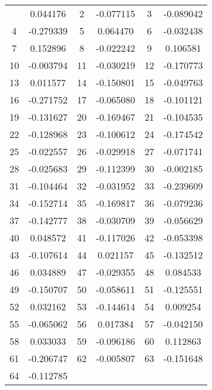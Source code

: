 \documentclass[12pt]{article}
\begin{document}
\begin{longtable}{@{}cc|cc|cc@{}}
\bottomrule
\endlastfoot
1 & 0.044176 & 2 & -0.077115 & 3 & -0.089042 \\
4 & -0.279339 & 5 & 0.064470 & 6 & -0.032438 \\
7 & 0.152896 & 8 & -0.022242 & 9 & 0.106581 \\
10 & -0.003794 & 11 & -0.030219 & 12 & -0.170773 \\
13 & 0.011577 & 14 & -0.150801 & 15 & -0.049763 \\
16 & -0.271752 & 17 & -0.065080 & 18 & -0.101121 \\
19 & -0.131627 & 20 & -0.169467 & 21 & -0.104535 \\
22 & -0.128968 & 23 & -0.100612 & 24 & -0.174542 \\
25 & -0.022557 & 26 & -0.029918 & 27 & -0.071741 \\
28 & -0.025683 & 29 & -0.112399 & 30 & -0.002185 \\
31 & -0.104464 & 32 & -0.031952 & 33 & -0.239609 \\
34 & -0.152714 & 35 & -0.169817 & 36 & -0.079236 \\
37 & -0.142777 & 38 & -0.030709 & 39 & -0.056629 \\
40 & 0.048572 & 41 & -0.117026 & 42 & -0.053398 \\
43 & -0.107614 & 44 & 0.021157 & 45 & -0.132512 \\
46 & 0.034889 & 47 & -0.029355 & 48 & 0.084533 \\
49 & -0.150707 & 50 & -0.058611 & 51 & -0.125551 \\
52 & 0.032162 & 53 & -0.144614 & 54 & 0.009254 \\
55 & -0.065062 & 56 & 0.017384 & 57 & -0.042150 \\
58 & 0.033033 & 59 & -0.096186 & 60 & 0.112863 \\
61 & -0.206747 & 62 & -0.005807 & 63 & -0.151648 \\
64 & -0.112785 &  &  &  &  \\

\end{longtable}
\end{document}
